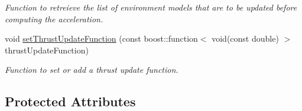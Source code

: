 \begin{DoxyCompactItemize}
\begin{DoxyCompactList}\small\item\em Function to retreieve the list of environment models that are to be updated before computing the acceleration. \end{DoxyCompactList}\item 
void \hyperlink{classtudat_1_1propulsion_1_1ThrustAcceleration_a9cd18b1627b379670313291e3acdf2c5}{set\+Thrust\+Update\+Function} (const boost\+::function$<$ void(const double) $>$ thrust\+Update\+Function)
\begin{DoxyCompactList}\small\item\em Function to set or add a thrust update function. \end{DoxyCompactList}\end{DoxyCompactItemize}
\subsection*{Protected Attributes}
